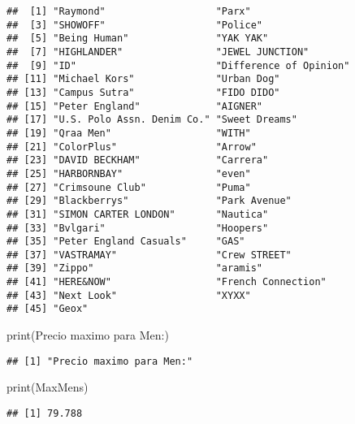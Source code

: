 \documentclass[
]{article}
\newenvironment{Shaded}{\begin{snugshade}}{\end{snugshade}}
\newcommand{\FunctionTok}[1]{\textcolor[rgb]{0.00,0.00,0.00}{#1}}
\newcommand{\NormalTok}[1]{#1}
\newcommand{\StringTok}[1]{\textcolor[rgb]{0.31,0.60,0.02}{#1}}
\begin{document}
\begin{verbatim}
##  [1] "Raymond"                   "Parx"                     
##  [3] "SHOWOFF"                   "Police"                   
##  [5] "Being Human"               "YAK YAK"                  
##  [7] "HIGHLANDER"                "JEWEL JUNCTION"           
##  [9] "ID"                        "Difference of Opinion"    
## [11] "Michael Kors"              "Urban Dog"                
## [13] "Campus Sutra"              "FIDO DIDO"                
## [15] "Peter England"             "AIGNER"                   
## [17] "U.S. Polo Assn. Denim Co." "Sweet Dreams"             
## [19] "Qraa Men"                  "WITH"                     
## [21] "ColorPlus"                 "Arrow"                    
## [23] "DAVID BECKHAM"             "Carrera"                  
## [25] "HARBORNBAY"                "even"                     
## [27] "Crimsoune Club"            "Puma"                     
## [29] "Blackberrys"               "Park Avenue"              
## [31] "SIMON CARTER LONDON"       "Nautica"                  
## [33] "Bvlgari"                   "Hoopers"                  
## [35] "Peter England Casuals"     "GAS"                      
## [37] "VASTRAMAY"                 "Crew STREET"              
## [39] "Zippo"                     "aramis"                   
## [41] "HERE&NOW"                  "French Connection"        
## [43] "Next Look"                 "XYXX"                     
## [45] "Geox"
\end{verbatim}

\begin{Shaded}
\begin{Highlighting}[]
\FunctionTok{print}\NormalTok{(}\StringTok{\textquotesingle{}Precio maximo para Men:\textquotesingle{}}\NormalTok{)}
\end{Highlighting}
\end{Shaded}

\begin{verbatim}
## [1] "Precio maximo para Men:"
\end{verbatim}

\begin{Shaded}
\begin{Highlighting}[]
\FunctionTok{print}\NormalTok{(MaxMens)}
\end{Highlighting}
\end{Shaded}

\begin{verbatim}
## [1] 79.788
\end{verbatim}
\end{document}
